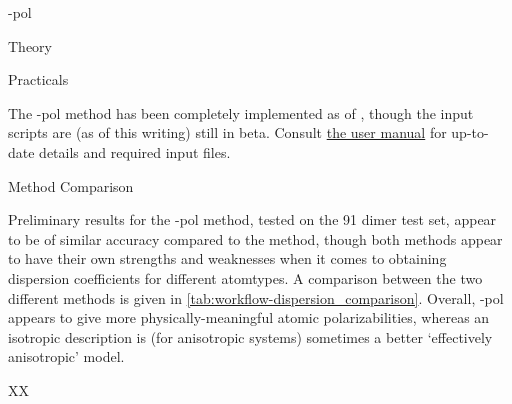 \begin{subsubsection}{\isa-pol}
\begin{paragraph}{Theory}
\end{paragraph}
\begin{paragraph}{Practicals}

The \isa-pol method has been completely implemented as of , though
the input scripts are (as of this writing) still in beta. Consult 
\href{http://www-stone.ch.cam.ac.uk/programs/camcasp.html}{the \camcasp user
manual} for up-to-date details and required input files.

\end{paragraph}

\end{subsubsection}
\begin{subsubsection}{Method Comparison}
\label{sec:workflow-dispersion_comparison}


Preliminary results for the \isa-pol method, tested on the 91 dimer test set,
appear to be of similar accuracy compared to the \idma method, though both
methods appear to have their own strengths and weaknesses when it comes to
obtaining dispersion coefficients for different atomtypes. A comparison
between the two different methods is given in
\cref{tab:workflow-dispersion_comparison}. Overall, \isa-pol appears to give
more physically-meaningful atomic polarizabilities, whereas an isotropic \idma
description is (for
anisotropic systems) sometimes a better `effectively anisotropic'
model.\footnotemark{ }


\begin{table}
\centering
\begin{tabu}{XX}


\end{tabu}
\end{table}
\end{subsubsection}

